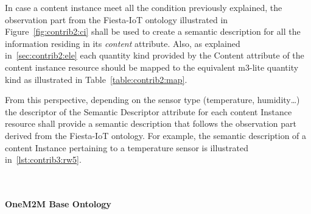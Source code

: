In case a content instance meet all the condition previously explained, the observation part from the Fiesta-IoT ontology illustrated in Figure~\ref{fig:contrib2:ci} shall be used to create a semantic description for all the information residing in its \textit{content} attribute. Also, as explained in~\ref{sec:contrib2:ele} each quantity kind provided by the Content attribute of the content instance resource should be mapped to the equivalent m3-lite quantity kind as illustrated in Table~\ref{table:contrib2:map}.\par

From this perspective, depending on the sensor type (temperature, humidity\ldots) the descriptor of the Semantic Descriptor attribute for each content Instance resource shall provide a semantic description that follows the observation part derived from the Fiesta-IoT ontology. For example, the semantic description of a content Instance pertaining to a temperature sensor is illustrated in~\ref{lst:contrib3:rw5}.\par

\lstset{caption=the semantic description of the resource corresponding to a content instance, label=lst:contrib3:rw5,
language=xml, breaklines=true, numbers=left, basicstyle=\small\ttfamily,
stepnumber=1, frame=single, inputencoding=utf8/latin1}~

\paragraph{OneM2M Base Ontology }
